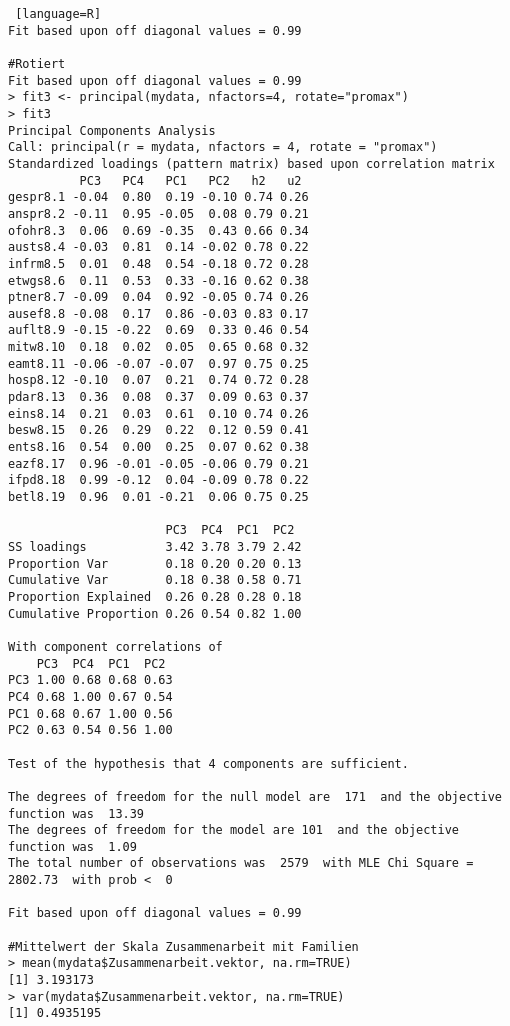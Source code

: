 \begin{lstlisting} [language=R]
Fit based upon off diagonal values = 0.99

#Rotiert 
Fit based upon off diagonal values = 0.99
> fit3 <- principal(mydata, nfactors=4, rotate="promax")
> fit3
Principal Components Analysis
Call: principal(r = mydata, nfactors = 4, rotate = "promax")
Standardized loadings (pattern matrix) based upon correlation matrix
          PC3   PC4   PC1   PC2   h2   u2
gespr8.1 -0.04  0.80  0.19 -0.10 0.74 0.26
anspr8.2 -0.11  0.95 -0.05  0.08 0.79 0.21
ofohr8.3  0.06  0.69 -0.35  0.43 0.66 0.34
austs8.4 -0.03  0.81  0.14 -0.02 0.78 0.22
infrm8.5  0.01  0.48  0.54 -0.18 0.72 0.28
etwgs8.6  0.11  0.53  0.33 -0.16 0.62 0.38
ptner8.7 -0.09  0.04  0.92 -0.05 0.74 0.26
ausef8.8 -0.08  0.17  0.86 -0.03 0.83 0.17
auflt8.9 -0.15 -0.22  0.69  0.33 0.46 0.54
mitw8.10  0.18  0.02  0.05  0.65 0.68 0.32
eamt8.11 -0.06 -0.07 -0.07  0.97 0.75 0.25
hosp8.12 -0.10  0.07  0.21  0.74 0.72 0.28
pdar8.13  0.36  0.08  0.37  0.09 0.63 0.37
eins8.14  0.21  0.03  0.61  0.10 0.74 0.26
besw8.15  0.26  0.29  0.22  0.12 0.59 0.41
ents8.16  0.54  0.00  0.25  0.07 0.62 0.38
eazf8.17  0.96 -0.01 -0.05 -0.06 0.79 0.21
ifpd8.18  0.99 -0.12  0.04 -0.09 0.78 0.22
betl8.19  0.96  0.01 -0.21  0.06 0.75 0.25

                      PC3  PC4  PC1  PC2
SS loadings           3.42 3.78 3.79 2.42
Proportion Var        0.18 0.20 0.20 0.13
Cumulative Var        0.18 0.38 0.58 0.71
Proportion Explained  0.26 0.28 0.28 0.18
Cumulative Proportion 0.26 0.54 0.82 1.00

With component correlations of 
    PC3  PC4  PC1  PC2
PC3 1.00 0.68 0.68 0.63
PC4 0.68 1.00 0.67 0.54
PC1 0.68 0.67 1.00 0.56
PC2 0.63 0.54 0.56 1.00

Test of the hypothesis that 4 components are sufficient.

The degrees of freedom for the null model are  171  and the objective function was  13.39
The degrees of freedom for the model are 101  and the objective function was  1.09 
The total number of observations was  2579  with MLE Chi Square =  2802.73  with prob <  0 

Fit based upon off diagonal values = 0.99

#Mittelwert der Skala Zusammenarbeit mit Familien
> mean(mydata$Zusammenarbeit.vektor, na.rm=TRUE)
[1] 3.193173
> var(mydata$Zusammenarbeit.vektor, na.rm=TRUE)
[1] 0.4935195


\end{lstlisting}
